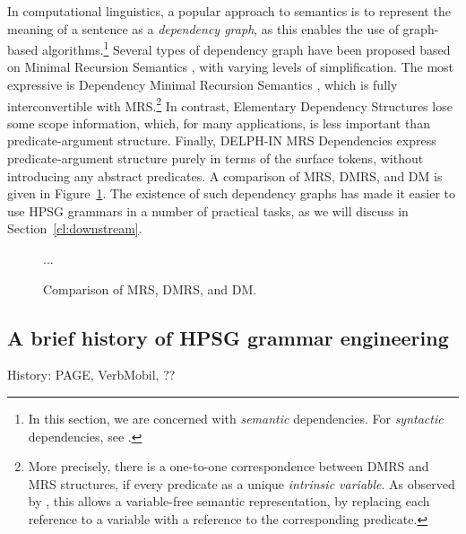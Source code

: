 \documentclass[output=paper,nonflat]{langsci/langscibook}
\begin{document}
In computational linguistics,
a popular approach to semantics is to represent the meaning of a sentence as a \textit{dependency graph},
as this enables the use of graph-based algorithms.\footnote{%
	In this section, we are concerned with \emph{semantic} dependencies.
	For \emph{syntactic} dependencies, see .
}
Several types of dependency graph have been proposed
based on Minimal Recursion Semantics \citep[MRS;][]{CFPS2005a},
with varying levels of simplification.
The most expressive is Dependency Minimal Recursion Semantics \citep[DMRS;][]{copestake2009dmrs},
which is fully interconvertible with MRS.\footnote{%
	More precisely, there is a one-to-one correspondence between DMRS and MRS structures,
	if every predicate as a unique \textit{intrinsic variable}.
	As observed by \citet{oepen2006eds}, this allows a variable-free semantic representation,
	by replacing each reference to a variable with a reference to the corresponding predicate.
}
In contrast, Elementary Dependency Structures \citep[EDS;][]{oepen2006eds}
lose some scope information,
which, for many applications, is less important than predicate-argument structure.
Finally, DELPH-IN MRS Dependencies \citep[DM;][]{ivanova2012dm}
express predicate-argument structure purely in terms of the surface tokens,
without introducing any abstract predicates.
A comparison of MRS, DMRS, and DM is given in Figure~\ref{cl:fig:dep}.
The existence of such dependency graphs
has made it easier to use HPSG grammars in a number of practical tasks,
as we will discuss in Section~\ref{cl:downstream}.




\begin{figure}
\centering
...
\caption{Comparison of MRS, DMRS, and DM.}
\label{cl:fig:dep}
\end{figure}


\subsection{A brief history of HPSG grammar engineering}
\label{cl:history}

History: PAGE, VerbMobil, ?? %

\end{document}
